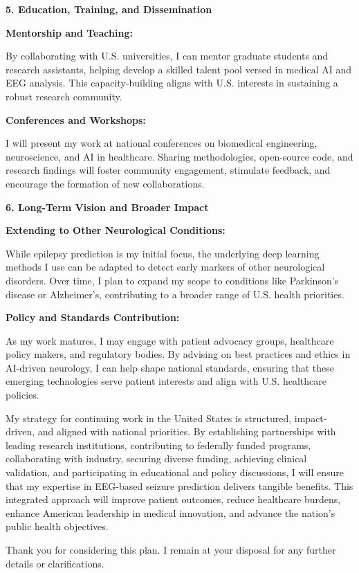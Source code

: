 \documentclass{article}
\begin{document}
{\bf 5. Education, Training, and Dissemination }

{\bf Mentorship and Teaching: }

By collaborating with U.S. universities, I can mentor graduate students and research assistants, helping develop a skilled talent pool versed in medical AI and EEG analysis. This capacity-building aligns with U.S. interests in sustaining a robust research community.

{\bf Conferences and Workshops: }

I will present my work at national conferences on biomedical engineering, neuroscience, and AI in healthcare. Sharing methodologies, open-source code, and research findings will foster community engagement, stimulate feedback, and encourage the formation of new collaborations.

{\bf 6. Long-Term Vision and Broader Impact } 

{\bf Extending to Other Neurological Conditions: }

While epilepsy prediction is my initial focus, the underlying deep learning methods I use can be adapted to detect early markers of other neurological disorders. Over time, I plan to expand my scope to conditions like Parkinson’s disease or Alzheimer’s, contributing to a broader range of U.S. health priorities.

{\bf Policy and Standards Contribution: }

As my work matures, I may engage with patient advocacy groups, healthcare policy makers, and regulatory bodies. By advising on best practices and ethics in AI-driven neurology, I can help shape national standards, ensuring that these emerging technologies serve patient interests and align with U.S. healthcare policies.

My strategy for continuing work in the United States is structured, impact-driven, and aligned with national priorities. By establishing partnerships with leading research institutions, contributing to federally funded programs, collaborating with industry, securing diverse funding, achieving clinical validation, and participating in educational and policy discussions, I will ensure that my expertise in EEG-based seizure prediction delivers tangible benefits. This integrated approach will improve patient outcomes, reduce healthcare burdens, enhance American leadership in medical innovation, and advance the nation’s public health objectives.

Thank you for considering this plan. I remain at your disposal for any further details or clarifications.
\end{document}
